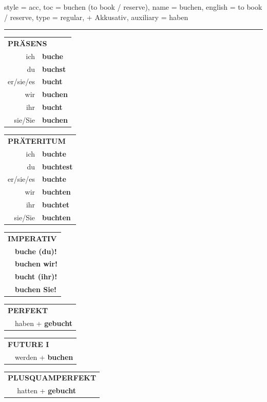 \begin{verbentry}{
  style = {acc},
  toc = {buchen (to book / reserve)},
  name = {buchen},
  english = {to book / reserve},
  type = {regular, + Akkusativ},
  auxiliary = {haben}
}


\vspace{5pt}
\hrule
\vspace{5pt}

\begin{tabular}{rl}
\multicolumn{2}{l}{\textbf{PRÄSENS}}\\
ich & \textbf{buche}\\
du & \textbf{buchst}\\
er/sie/es & \textbf{bucht}\\
wir & \textbf{buchen}\\
ihr & \textbf{bucht}\\
sie/Sie & \textbf{buchen}\\
\end{tabular}
\hfill
\begin{tabular}{rl}
\multicolumn{2}{l}{\textbf{PRÄTERITUM}}\\
ich & \textbf{buchte}\\
du & \textbf{buchtest}\\
er/sie/es & \textbf{buchte}\\
wir & \textbf{buchten}\\
ihr & \textbf{buchtet}\\
sie/Sie & \textbf{buchten}\\
\end{tabular}
\hfill
\begin{tabular}{rl}
\multicolumn{2}{l}{\textbf{IMPERATIV}}\\
& \textbf{buche (du)!}\\
& \textbf{buchen wir!}\\
& \textbf{bucht (ihr)!}\\
& \textbf{buchen Sie!}\\
\end{tabular}

\vspace{10pt}

\begin{tabular}{rl}
\multicolumn{2}{l}{\textbf{PERFEKT}}\\
& haben + \textbf{gebucht}\\
\end{tabular}
\hfill
\begin{tabular}{rl}
\multicolumn{2}{l}{\textbf{FUTURE I}}\\
& werden + \textbf{buchen}\\
\end{tabular}
\hfill
\begin{tabular}{rl}
\multicolumn{2}{l}{\textbf{PLUSQUAMPERFEKT}}\\
& hatten + \textbf{gebucht}\\
\end{tabular}


\end{verbentry}
